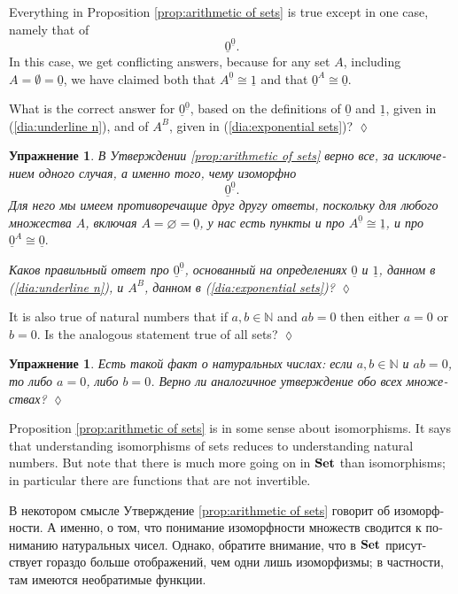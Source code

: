 \documentclass[a4paper]{book}
\def\NN{{\mathbb N}}
\def\iso{\cong}
\def\ul{\underline}
\def\Set{{\bf Set}}
\theoremstyle{myth}
\newtheorem{excENG}[envENG]{\begin{english}Exercise\end{english}}
\newenvironment{exerciseENG}{\begin{excENG}}{\hspace*{\fill}$\lozenge$\end{excENG}}
\newtheorem{excRUS}[envRUS]{Упражнение}
\newenvironment{exerciseRUS}{\begin{excRUS}}{\hspace*{\fill}$\lozenge$\end{excRUS}}
\begin{document}
\begin{russian}
\begin{exerciseENG}\label{exc:0 to the 0}
Everything in Proposition \ref{prop:arithmetic of sets} is true except in one case, namely that of $$\ul{0}^{\ul{0}}.$$ In this case, we get conflicting answers, because for any set $A$, including $A=\emptyset=\ul{0}$, we have claimed both that $A^{\ul{0}}\iso\ul{1}$ and that $\ul{0}^A\iso\ul{0}.$ 

What is the correct answer for $\ul{0}^{\ul{0}}$, based on the definitions of $\ul{0}$ and $\ul{1}$, given in (\ref{dia:underline n}), and of $A^B$, given in (\ref{dia:exponential sets})?
\end{exerciseENG}

\begin{exerciseRUS}\label{exc:0 to the 0}
В Утверждении \ref{prop:arithmetic of sets} верно все, за исключением одного случая, а именно того, чему изоморфно $$\ul{0}^{\ul{0}}.$$ Для него мы имеем противоречащие друг другу ответы, поскольку для любого множества $A$, включая $A=\varnothing=\ul{0}$, у нас есть пункты и про $A^{\ul{0}}\iso\ul{1}$, и про $\ul{0}^A\iso\ul{0}.$ 

Каков правильный ответ про $\ul{0}^{\ul{0}}$, основанный на определениях $\ul{0}$ и $\ul{1}$, данном в (\ref{dia:underline n}), и $A^B$, данном в (\ref{dia:exponential sets})?
\end{exerciseRUS}

\begin{exerciseENG}
It is also true of natural numbers that if $a,b\in\NN$ and $ab=0$ then either $a=0$ or $b=0$. Is the analogous statement true of all sets?
\end{exerciseENG}

\begin{exerciseRUS}
Есть такой факт о натуральных числах: если $a,b\in\NN$ и $ab=0$, то либо $a=0$, либо $b=0$. Верно ли аналогичное утверждение обо всех множествах?
\end{exerciseRUS}

Proposition \ref{prop:arithmetic of sets} is in some sense about isomorphisms. It says that understanding isomorphisms of sets reduces to understanding natural numbers. But note that there is much more going on in $\Set$ than isomorphisms; in particular there are functions that are not invertible.

В некотором смысле Утверждение \ref{prop:arithmetic of sets} говорит об изоморфности. А именно, о том, что понимание изоморфности множеств сводится к пониманию натуральных чисел. Однако, обратите внимание, что в $\Set$ присутствует гораздо больше отображений, чем одни лишь изоморфизмы; в частности, там имеются необратимые функции.


\end{russian}
\end{document}
